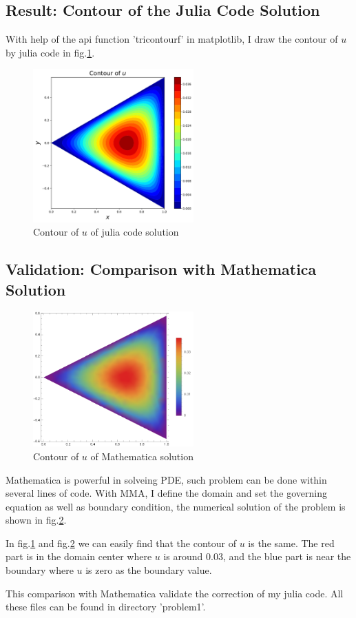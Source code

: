 \subsection{Result: Contour of the Julia Code Solution}

With help of the api function 'tricontourf' in matplotlib, 
I draw the contour of $u$ by julia code in fig.\ref{julia code solution}.

\begin{figure}[H]
    \centering
    \includegraphics[width=0.55\textwidth]{..//problem1/image/solution_julia.pdf}
    \caption{Contour of $u$ of julia code solution}
    \label{julia code solution}
\end{figure}

\subsection{Validation: Comparison with Mathematica Solution}

\begin{figure}[H]
    \centering
    \includegraphics[width=0.55\textwidth]{..//problem1/image/solution_mma.pdf}
    \caption{Contour of $u$ of Mathematica solution}
    \label{mma solution}
\end{figure}

Mathematica is powerful in solveing PDE, 
such problem can be done within several lines of code. 
With MMA, I define the domain and set the governing equation as well as boundary condition, 
the numerical solution of the problem is shown in fig.\ref{mma solution}.

In fig.\ref{julia code solution} and fig.\ref{mma solution} we can easily find that 
the contour of $u$ is the same. 
The red part is in the domain center where $u$ is around $0.03$, 
and the blue part is near the boundary where $u$ is zero as the boundary value. 

This comparison with Mathematica validate the correction of my julia code. 
All these files can be found in directory 'problem1'.